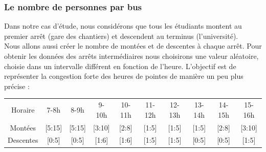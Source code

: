 \documentclass[a4paper,11pt]{article}
\begin{document}
		\subsubsection{Le nombre de personnes par bus}
			Dans notre cas d'étude, nous considérons que tous les étudiants montent au premier arrêt (gare des chantiers) et descendent au terminus (l'université).\\
			Nous allons aussi créer le nombre de montées et de descentes à chaque arrêt.
 			Pour obtenir les données des arrêts intermédiaires nous choisirons une valeur aléatoire, choisie dans un intervalle différent en fonction de l'heure. L'objectif est de représenter la congestion forte des heures de pointes de manière un peu plus précise : \\
 			\begin{tabular}{ | c | c | c | c | c | c | c | c | c | c |}
 				\hline			
   				Horaire 	& 7-8h & 8-9h & 9-10h & 10-11h & 11-12h & 12-13h & 13-14h & 14-15h & 15-16h\\
   				Montées 	& [5:15] & [5:15] & [3:10] & [2:8] & [1:5] & [1:5] & [1:5] & [2:8] & [3:10]\\
   				Descentes 	& [0:5] & [0:5] & [1:6] & [1:6] & [1:5] & [1:5] & [0:5] & [0:5] & [1:5]\\
 				\hline  
 			\end{tabular}\\
\end{document}
